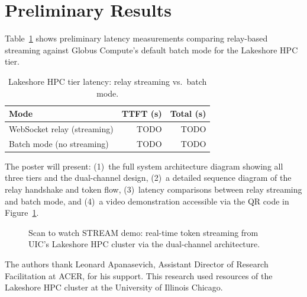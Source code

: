 \documentclass[manuscript, review]{acmart}
\begin{document}
\section{Preliminary Results}

Table~\ref{tab:latency} shows preliminary latency measurements comparing relay-based streaming against Globus Compute's default batch mode for the Lakeshore HPC tier.

\begin{table}[h]
\centering
\caption{Lakeshore HPC tier latency: relay streaming vs.\ batch mode.}
\label{tab:latency}
\small
\begin{tabular}{@{}lrr@{}}
\toprule
\textbf{Mode} & \textbf{TTFT (s)} & \textbf{Total (s)} \\
\midrule
WebSocket relay (streaming) & TODO & TODO \\
Batch mode (no streaming)   & TODO & TODO \\
\bottomrule
\end{tabular}
\end{table}

The poster will present: (1)~the full system architecture diagram showing all three tiers and the dual-channel design, (2)~a detailed sequence diagram of the relay handshake and token flow, (3)~latency comparisons between relay streaming and batch mode, and (4)~a video demonstration accessible via the QR code in Figure~\ref{fig:qr}.

\begin{figure}[h]
    \centering
    \caption{Scan to watch STREAM demo: real-time token streaming from UIC's Lakeshore HPC cluster via the dual-channel architecture.}
    \label{fig:qr}
\end{figure}

\begin{acks}
The authors thank Leonard Apanasevich, Assistant Director of Research Facilitation at ACER, for his support. This research used resources of the Lakeshore HPC cluster at the University of Illinois Chicago.
\end{acks}
\end{document}
